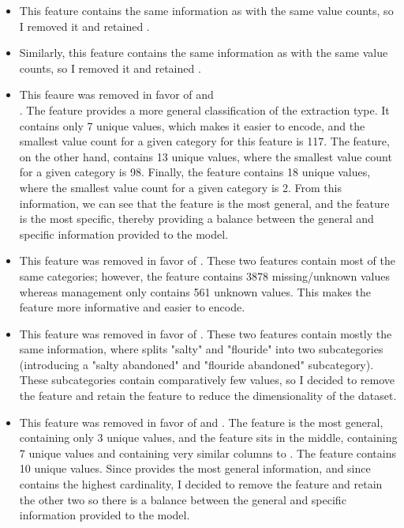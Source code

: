 \documentclass{article}
\begin{document}
\begin{itemize}
  \item {} This feature contains the same information as  with the same value counts, so I removed it and retained .
  \item {} Similarly, this feature contains the same information as  with the same value counts, so I removed it and retained .
  \item {} This feaure was removed in favor of  and \\ . The  feature provides a more general classification of the extraction type. It contains only 7 unique values, which makes it easier to encode, and the smallest value count for a given category for this feature is 117. The  feature, on the other hand, contains 13 unique values, where the smallest value count for a given category is 98. Finally, the  feature contains 18 unique values, where the smallest value count for a given category is 2. From this information, we can see that the  feature is the most general, and the  feature is the most specific, thereby providing a balance between the general and specific information provided to the model. 
  \item {} This feature was removed in favor of . These two features contain most of the same categories; however, the  feature contains 3878 missing/unknown values whereas management only contains 561 unknown values. This makes the  feature more informative and easier to encode.
  \item {} This feature was removed in favor of . These two features contain mostly the same information, where  splits "salty" and "flouride" into two subcategories (introducing a "salty abandoned" and "flouride abandoned" subcategory). These subcategories contain comparatively few values, so I decided to remove the  feature and retain the  feature to reduce the dimensionality of the dataset.
  \item {} This feature was removed in favor of  and . The  feature is the most general, containing only 3 unique values, and the  feature sits in the middle, containing 7 unique values and containing very similar columns to . The  feature contains 10 unique values. Since  provides the most general information, and since  contains the highest cardinality, I decided to remove the  feature and retain the other two so there is a balance between the general and specific information provided to the model.

\end{itemize}
\end{document}

